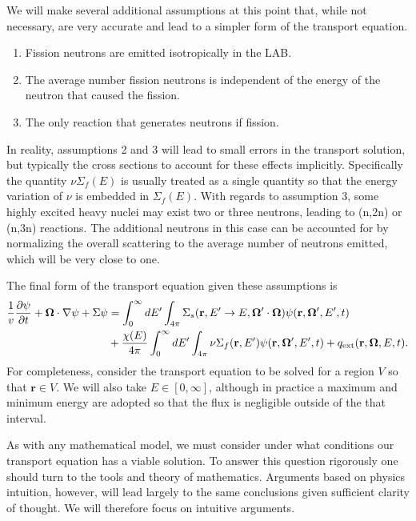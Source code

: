 \documentclass[11pt]{article}
\renewcommand\vec{\mathbf}
\begin{document}
We will make several additional assumptions at this point that, while not necessary, are very accurate and lead to a simpler form of the transport equation.
\begin{enumerate}
\item Fission neutrons are emitted isotropically in the LAB.
\item The average number fission neutrons is independent of the energy of the neutron that caused the fission.
\item The only reaction that generates neutrons if fission.
\end{enumerate}
In reality, assumptions 2 and 3 will lead to small errors in the transport solution, but typically the cross sections to account for these effects implicitly.  Specifically the quantity \(\nu\Sigma_f(E)\) is usually treated as a single quantity so that the energy variation of \(\nu\) is embedded in \(\Sigma_f(E)\).  With regards to assumption 3, some highly excited heavy nuclei may exist two or three neutrons, leading to (n,2n) or (n,3n) reactions.  The additional neutrons in this case can be accounted for by normalizing the overall scattering to the average number of neutrons emitted, which will be very close to one.

The final form of the transport equation given these assumptions is
\begin{align}
  \frac{1}{v} \frac{\partial\psi}{\partial t}
  + \vec{\Omega} \cdot \nabla\psi
  + \Sigma \psi
  &= \int_0^\infty dE' \int_{4\pi} \Sigma_s(\vec{r},E' \rightarrow E, \vec{\Omega}'\cdot\vec{\Omega}) \psi(\vec{r},\vec{\Omega}',E',t) \notag\\
  &+ \frac{\chi(E)}{4\pi} \int_0^\infty dE' \int_{4\pi} \nu\Sigma_f(\vec{r},E') \psi(\vec{r},\vec{\Omega}',E',t)
  + q_\text{ext}(\vec{r},\vec{\Omega},E,t).
  \label{eq::transportEqn}
\end{align}
For completeness, consider the transport equation to be solved for a region \(V\) so that \(\vec{r} \in V\).  We will also take \(E \in [0, \infty]\), although in practice a maximum and minimum energy are adopted so that the flux is negligible outside of the that interval.

As with any mathematical model, we must consider under what conditions our transport equation has a viable solution.  To answer this question rigorously one should turn to the tools and theory of mathematics.  Arguments based on physics intuition, however, will lead largely to the same conclusions given sufficient clarity of thought.  We will therefore focus on intuitive arguments.
\end{document}
